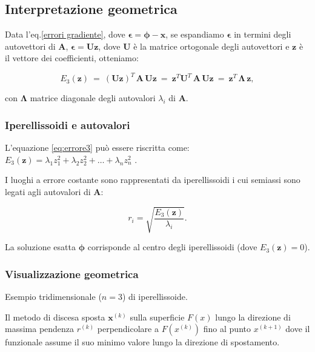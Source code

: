 %
%
%
\subsection{Interpretazione geometrica}

Data l'eq.\eqref{errori gradiente}, dove \(\mathbf{\epsilon} = \mathbf{\phi} - \mathbf{x}\), se espandiamo \(\mathbf{\epsilon}\) in termini degli autovettori di \(\mathbf{A}\), $\mathbf{\epsilon} = \mathbf{U} \mathbf{z}$, dove \(\mathbf{U}\) è la matrice ortogonale degli autovettori e \(\mathbf{z}\) è il vettore dei coefficienti, otteniamo:

\begin{equation*}
	E_3(\mathbf{z})\ =\  (\mathbf{U} \mathbf{z})^T\, \mathbf{A}\, \mathbf{U} \mathbf{z}\ =\ \mathbf{z}^T \mathbf{U}^T\, \mathbf{A}\, \mathbf{U} \mathbf{z}\ =\ \mathbf{z}^T\, \mathbf{\Lambda}\, \mathbf{z},
\end{equation*}

con \(\mathbf{\Lambda}\) matrice diagonale degli autovalori \(\lambda_i\) di \(\mathbf{A}\).

\subsubsection{Iperellissoidi e autovalori}

L'equazione \eqref{eq:errore3} può essere riscritta come: $E_3(\mathbf{z}) = \lambda_1 z_1^2 + \lambda_2 z_2^2 + \dots + \lambda_n z_n^2$ .

I luoghi a errore costante sono rappresentati da iperellissoidi i cui semiassi sono legati agli autovalori di \(\mathbf{A}\):

\begin{equation*}
	r_i = \sqrt{\frac{E_3(\mathbf{z})}{\lambda_i}}.
\end{equation*}

La soluzione esatta \(\mathbf{\phi}\) corrisponde al centro degli iperellissoidi (dove \(E_3(\mathbf{z}) = 0\)).

\subsubsection{Visualizzazione geometrica}
Esempio tridimensionale (\(n=3\)) di iperellissoide.

Il metodo di discesa sposta \(\mathbf{x}^{(k)}\) sulla superficie $F(x)$ lungo la direzione di massima pendenza $r^{(k)}$ perpendicolare a $F(x^{(k)})$ fino al punto $x^{(k+1)}$ dove il funzionale assume il suo minimo valore lungo la direzione di spostamento.

